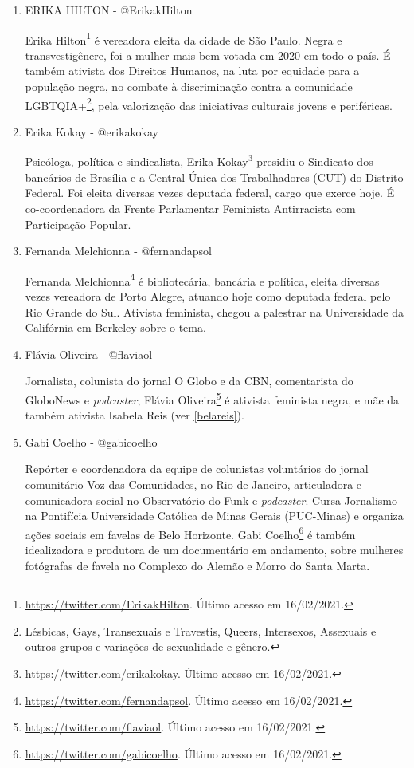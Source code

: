 \documentclass[
	12pt,				%
	openright,			%
	twoside,			%
	a4paper,			%
	english,			%
	brazil				%
	]{abntex2}
\begin{document}
\begin{anexosenv}
\begin{enumerate}
 \item ERIKA HILTON - @ErikakHilton
 
 Erika Hilton\footnote{\url{https://twitter.com/ErikakHilton}. Último acesso em 16/02/2021.} é vereadora eleita da cidade de São Paulo. Negra e transvestigênere, foi a mulher mais bem votada em 2020 em todo o país. É também ativista dos Direitos Humanos, na luta por equidade para a população negra, no combate à discriminação contra a comunidade LGBTQIA+\footnote{Lésbicas, Gays, Transexuais e Travestis, Queers, Intersexos, Assexuais e outros grupos e variações de sexualidade e gênero.}, pela valorização das iniciativas culturais jovens e periféricas.

 \item Erika Kokay - @erikakokay
 
 Psicóloga, política e sindicalista, Erika Kokay\footnote{\url{https://twitter.com/erikakokay}. Último acesso em 16/02/2021.} presidiu o Sindicato dos bancários de Brasília e a Central Única dos Trabalhadores (CUT) do Distrito Federal. Foi eleita diversas vezes deputada federal, cargo que exerce hoje. É co-coordenadora da Frente Parlamentar Feminista Antirracista com Participação Popular.

 \item Fernanda Melchionna - @fernandapsol
 
 Fernanda Melchionna\footnote{\url{https://twitter.com/fernandapsol}. Último acesso em 16/02/2021.} é bibliotecária, bancária e política, eleita diversas vezes vereadora de Porto Alegre, atuando hoje como deputada federal pelo Rio Grande do Sul. Ativista feminista, chegou a palestrar na Universidade da Califórnia em Berkeley sobre o tema.
 
 \item Flávia Oliveira - @flaviaol
 
 Jornalista, colunista do jornal O Globo e da CBN, comentarista do GloboNews e \textit{podcaster}, Flávia Oliveira\footnote{\url{https://twitter.com/flaviaol}. Último acesso em 16/02/2021.} é ativista feminista negra, e mãe da também ativista Isabela Reis (ver \ref{belareis}).

 \item Gabi Coelho - @gabicoelho
 
 Repórter e coordenadora da equipe de colunistas voluntários do jornal comunitário Voz das Comunidades, no Rio de Janeiro, articuladora e comunicadora social no Observatório do Funk e \textit{podcaster}. Cursa Jornalismo na Pontifícia Universidade Católica de Minas Gerais (PUC-Minas) e organiza ações sociais em favelas de Belo Horizonte. Gabi Coelho\footnote{\url{https://twitter.com/gabicoelho}. Último acesso em 16/02/2021.} é também idealizadora e produtora de um documentário em andamento, sobre mulheres fotógrafas de favela no Complexo do Alemão e Morro do Santa Marta.


\end{enumerate}
\end{anexosenv}
\end{document}
